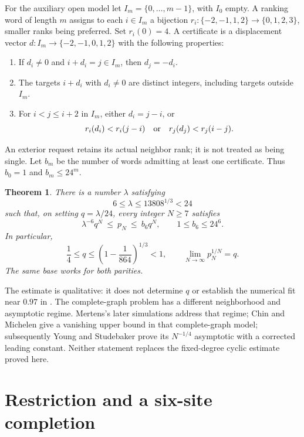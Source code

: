 \documentclass[11pt]{article}
\newtheorem{theorem}{Theorem}
\begin{document}
For the auxiliary open model let $I_m=\{0,\ldots,m-1\}$, with $I_0$
empty. A ranking word of length $m$ assigns to each $i\in I_m$ a
bijection $r_i:\{-2,-1,1,2\}\to\{0,1,2,3\}$, smaller ranks being
preferred. Set $r_i(0)=4$. A certificate is a displacement vector
$d:I_m\to\{-2,-1,0,1,2\}$ with the following properties:
\begin{enumerate}
\item If $d_i\ne0$ and $i+d_i=j\in I_m$, then $d_j=-d_i$.
\item The targets $i+d_i$ with $d_i\ne0$ are distinct integers,
including targets outside $I_m$.
\item For $i<j\leq i+2$ in $I_m$, either $d_i=j-i$, or
\[
 r_i(d_i)<r_i(j-i)\quad\hbox{or}\quad r_j(d_j)<r_j(i-j).
\]
\end{enumerate}
An exterior request retains its actual neighbor rank; it is not treated
as being single. Let $b_m$ be the number of words admitting at least one
certificate. Thus $b_0=1$ and $b_m\leq24^m$.

\begin{theorem}\label{thm:main}
There is a number $\lambda$ satisfying
\[
  6\leq\lambda\leq 13808^{1/3}<24
\]
such that, on setting $q=\lambda/24$, every integer $N\geq7$ satisfies
\begin{equation}\label{eq:main}
 \lambda^{-6}q^N\ \leq\ p_N\ \leq\ b_6q^N,
 \qquad 1\leq b_6\leq24^6.
\end{equation}
In particular,
\[
 \frac14\leq q\leq\left(1-\frac1{864}\right)^{1/3}<1,
 \qquad \lim_{N\to\infty}p_N^{1/N}=q.
\]
The same base works for both parities.
\end{theorem}

The estimate is qualitative: it does not determine $q$ or establish the
numerical fit near $0.97$ in \cite[Section~3.2]{mertens2005}.
The complete-graph problem has a different neighborhood and asymptotic
regime. Mertens's later simulations \cite{mertens2015} address that regime;
Chin and Michelen \cite[Theorem~1]{chin2026} give a vanishing
upper bound in that complete-graph model; subsequently Young and
Studebaker \cite[Theorem~1.1]{young2026} prove its $N^{-1/4}$
asymptotic with a corrected leading constant. Neither statement replaces
the fixed-degree cyclic estimate proved here.

\section{Restriction and a six-site completion}
\end{document}

